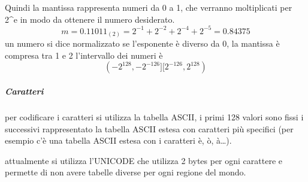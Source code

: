 \documentclass[
  paper=a4,
  oneside  ,captions=tableheading
]{scrbook}
\begin{document}
Quindi la mantissa rappresenta numeri da 0 a 1, che verranno
moltiplicati per 2\^{}e in modo da ottenere il numero desiderato. \[
m=0.11011_{(2)} =  2^{-1}+2^{-2}+2^{-4}+2^{-5} = 0.84375
\] un numero si dice normalizzato se l'esponente è diverso da 0, la
mantissa è compresa tra 1 e 2 l'intervallo dei numeri è \[
(-2^{128}, -2^{-126}][2^{-126}, 2^{128})
\]

\hypertarget{caratteri}{%
\subparagraph{Caratteri}\label{caratteri}}

per codificare i caratteri si utilizza la tabella ASCII, i primi 128
valori sono fissi i successivi rappresentato la tabella ASCII estesa con
caratteri più specifici (per esempio c'è una tabella ASCII estesa con i
caratteri è, ò, à\ldots).

attualmente si utilizza l'UNICODE che utilizza 2 bytes per ogni
carattere e permette di non avere tabelle diverse per ogni regione del
mondo.
\end{document}
